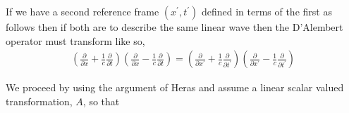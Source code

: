 If we have a second reference frame $(x^\prime, t^\prime)$ defined in terms of the first as follows
then if both are to describe the same linear wave then the D'Alembert operator must transform like so,
\begin{align}
  \left(\frac{\partial }{\partial x}  + \frac{1}{c}\frac{\partial }{\partial t}\right)
  \left(\frac{\partial }{\partial x}  - \frac{1}{c}\frac{\partial }{\partial t}\right) =
  \left(\frac{\partial }{\partial x^\prime}  + \frac{1}{c}\frac{\partial }{\partial t^\prime}\right)
  \left(\frac{\partial }{\partial x^\prime}  - \frac{1}{c}\frac{\partial }{\partial t^\prime}\right)
\end{align}

We proceed by using the argument of Heras\cite{Heras2016} and assume a linear scalar valued transformation, $A$,
so that

